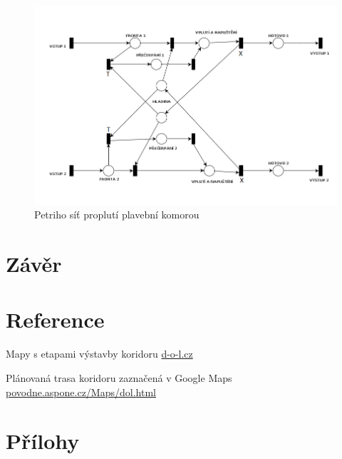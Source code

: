 \documentclass[11pt,a4paper]{article}
\begin{document}
      \begin{figure}[ht!]
        \centering
        \includegraphics[width=1\textwidth, natwidth=940, natheight=325]
                        {petri_net_2.png}
        \caption{Petriho síť proplutí plavební komorou \label{petri_2}}
      \end{figure}

  \section{Závěr}

  \section{Reference}

    \begin{enumerate}[label={[\arabic*]}]
      \item Mapy s etapami výstavby koridoru 
        \href{http://d-o-l.cz/index.php/cs/kestazeni/category/14}
             {d-o-l.cz}
      \item Plánovaná trasa koridoru zaznačená v Google Maps
        \href{http://povode.aspone.cz/Maps/dol.html}
             {povodne.aspone.cz/Maps/dol.html}
    \end{enumerate}

  \appendix
    \newpage

  \section{Přílohy}

  
\end{document}
